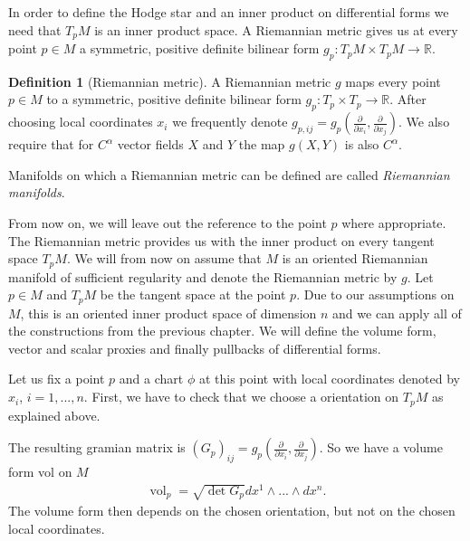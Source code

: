 \documentclass[12pt,a4paper]{article}
\numberwithin{equation}{subsection}
\numberwithin{lemma}{subsection}
\theoremstyle{definition}
\newtheorem{definition}[lemma]{Definition}
\DeclareMathOperator{\vol}{vol}
\newcommand{\real}{\mathbb{R}}
\begin{document}
In order to define the Hodge star and an inner product on differential forms
we need that 
$T_p M$ is an inner product space.
A Riemannian metric gives us at every point $p \in M$ 
a symmetric, positive definite bilinear form 
$g_p: T_p M \times T_p M \rightarrow \real$. 
\begin{definition}[Riemannian metric]
    A Riemannian metric $g$ maps every point $p\in M$ to 
    a symmetric, positive definite bilinear form $g_p: T_p \times T_p \rightarrow \real$.
    After choosing local coordinates $x_i$ we frequently denote 
    $g_{p,ij} = g_p(\frac{\partial}{\partial x_i}, \frac{\partial}{\partial x_j})$.
    We also require that for $C^\alpha$ vector fields $X$ and $Y$ the map 
    $g(X,Y)$ is also $C^\alpha$. 

    Manifolds on which a Riemannian metric can be defined are called 
    \textit{Riemannian manifolds}.
\end{definition}
From now on, we will leave out the reference to the point $p$ where appropriate.
The Riemannian metric provides us with the 
inner product on every tangent space $T_p M$. 
We will from now on assume that $M$ is an oriented Riemannian manifold of sufficient 
regularity and denote the Riemannian metric by $g$.
Let $p \in M$ and $T_p M$ be the tangent space at the point $p$. 
Due to our assumptions on $M$, this is an oriented inner product space of 
dimension $n$ and we can apply 
all of the constructions from the previous chapter. 
We will define the volume form, vector and scalar proxies and finally pullbacks
of differential forms.

Let us fix a point $p$ and a chart $\phi$ 
at this point with local coordinates denoted by $x_i$, $i=1,...,n$. 
First, we have to check that we choose a orientation on $T_p M$ as explained 
above.

The resulting gramian matrix is
$(G_p)_{ij} = g_p(\frac{\partial}{\partial x_i},\frac{\partial}{\partial x_j})$.
So we have a volume form vol on $M$ 
\begin{align*}
    \vol_p = \sqrt{\det G_p} dx^1 \wedge ... \wedge dx^n.
\end{align*}
The volume form then depends on the chosen orientation, but not on the 
chosen local coordinates.

\end{document}

